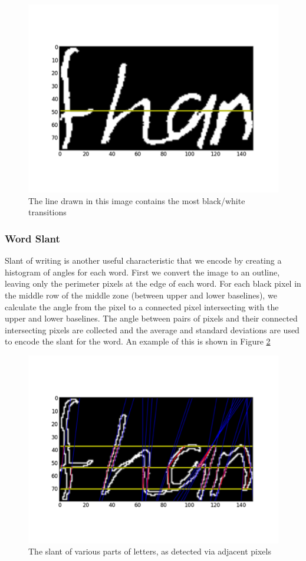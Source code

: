 \documentclass[paper=a4, fontsize=11pt]{scrartcl} %
\numberwithin{equation}{section} %
\numberwithin{figure}{section} %
\numberwithin{table}{section} %
\begin{document}
\begin{figure}
  \centering \includegraphics{wordwidth.png}
  \caption{The line drawn in this image contains the most black/white
    transitions}
  \label{fig:wordwidth}
\end{figure}

\subsubsection{Word Slant}
Slant of writing is another useful characteristic that we encode by
creating a histogram of angles for each word. First we convert the
image to an outline, leaving only the perimeter pixels at the edge of
each word. For each black pixel in the middle row of the middle zone
(between upper and lower baselines), we calculate the angle from the
pixel to a connected pixel intersecting with the upper and lower
baselines. The angle between pairs of pixels and their connected
intersecting pixels are collected and the average and standard
deviations are used to encode the slant for the word. An example of
this is shown in Figure \ref{fig:wordslant}

\begin{figure}
  \centering \includegraphics{wordslant.png}
  \caption{The slant of various parts of letters, as detected via
    adjacent pixels}
  \label{fig:wordslant}
\end{figure}
\end{document}
